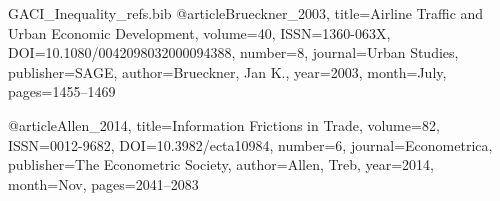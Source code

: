 \begin{filecontents*}[overwrite]{GACI_Inequality_refs.bib}
@article{Brueckner_2003, title={Airline Traffic and Urban Economic Development}, volume={40}, ISSN={1360-063X}, DOI={10.1080/0042098032000094388}, number={8}, journal={Urban Studies}, publisher={SAGE}, author={Brueckner, Jan K.}, year={2003}, month=July, pages={1455--1469} }

@article{Allen_2014, title={Information Frictions in Trade}, volume={82}, ISSN={0012-9682}, DOI={10.3982/ecta10984}, number={6}, journal={Econometrica}, publisher={The Econometric Society}, author={Allen, Treb}, year={2014}, month=Nov, pages={2041--2083} }


\end{filecontents*}
